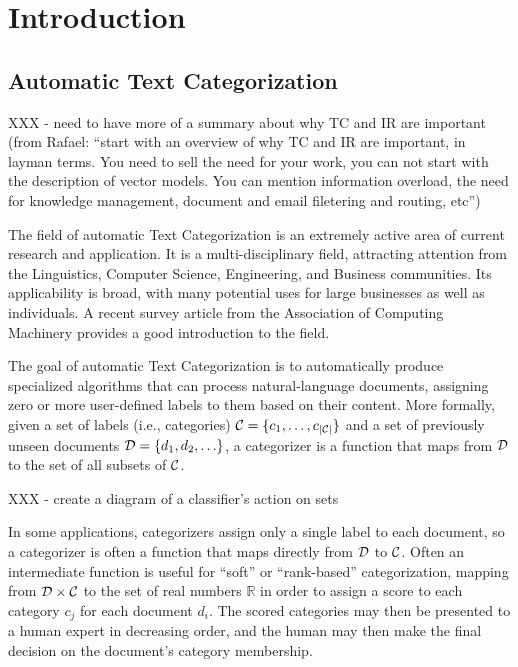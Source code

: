 \chapter{Introduction}

\section{Automatic Text Categorization}
\label{tc-intro}

XXX - need to have more of a summary about why TC and IR are important
(from Rafael: ``start with an overview of why TC and IR are important,
in layman terms.  You need to sell the need for your work, you can not
start with the description of vector models. You can mention
information overload, the need for knowledge management, document and
email filetering and routing, etc'')

The field of automatic Text Categorization is an extremely active area
of current research and application.  It is a multi-disciplinary
field, attracting attention from the Linguistics, Computer Science,
Engineering, and Business communities.  Its applicability is broad,
with many potential uses for large businesses as well as individuals.
A recent survey article from the Association of Computing Machinery
provides a good introduction to the field.\cite{sebastiani:02}

The goal of automatic Text Categorization is to automatically produce specialized
algorithms that can process natural-language documents, assigning zero
or more user-defined labels to them based on their content.  More
formally, given a set of labels (i.e., categories) $\mathcal{C} = \{c_1, \ldots, c_{|\mathcal{C}|}\}$ and a set of
previously unseen documents $\mathcal{D} = \{d_1, d_2, \ldots \}$, a categorizer is a
function that maps from $\mathcal{D}$ to the set of all subsets of $\mathcal{C}$.

XXX - create a diagram of a classifier's action on sets

In
some applications, categorizers assign only a single label to each
document, so a categorizer is often a function that maps directly from
$\mathcal{D}$ to $\mathcal{C}$.  Often an intermediate function is useful for ``soft'' or 
``rank-based'' categorization, mapping from $\mathcal{D} \times \mathcal{C}$ to
the set of real numbers $\mathbb{R}$ in order to assign a score to
each category $c_j$ for each document $d_i$.  The scored categories
may then be presented to a human expert in decreasing order, and the
human may then make the final decision on the document's category
membership.

